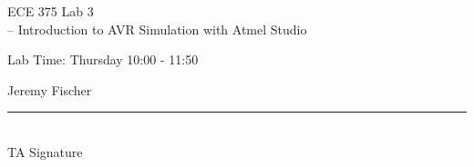 \documentclass[12pt,letterpaper]{article}
\begin{document}
\begin{titlepage}
    \vspace*{4cm}
    \begin{flushright}
    {\huge
        ECE 375 Lab 3\\[1cm]
    }
    {\large
       – Introduction to AVR Simulation with Atmel Studio
    }
    \end{flushright}
    \begin{flushleft}
    Lab Time: Thursday  10:00 - 11:50
    \end{flushleft}
    \begin{flushright}
    Jeremy Fischer

    \vfill
    \rule{5in}{.5mm}\\
    TA Signature
    \end{flushright}

\end{titlepage}
\end{document}
